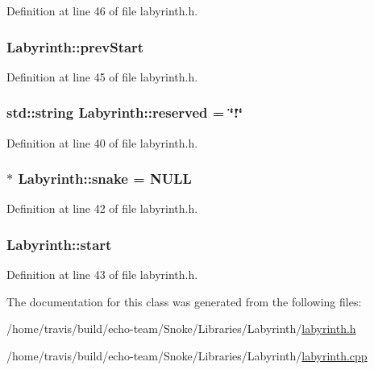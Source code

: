 Definition at line 46 of file labyrinth.\-h.

\hypertarget{class_labyrinth_a23e08d55e3a627e8a0d828d05be03253}{
\subsubsection[{prev\-Start}]{ Labyrinth\-::prev\-Start\hspace{0.3cm}{\ttfamily [private]}}}\label{class_labyrinth_a23e08d55e3a627e8a0d828d05be03253}


Definition at line 45 of file labyrinth.\-h.

\hypertarget{class_labyrinth_aafa921122b2ea77268cbe479949d7d39}{
\subsubsection[{reserved}]{\setlength{\rightskip}{0pt plus 5cm}std\-::string Labyrinth\-::reserved = \char`\"{}!\char`\"{}\hspace{0.3cm}{\ttfamily [private]}}}\label{class_labyrinth_aafa921122b2ea77268cbe479949d7d39}


Definition at line 40 of file labyrinth.\-h.

\hypertarget{class_labyrinth_a09a46368bfd83ccb75580687cb17b92f}{
\subsubsection[{snake}]{$\ast$ Labyrinth\-::snake = N\-U\-L\-L\hspace{0.3cm}{\ttfamily [private]}}}\label{class_labyrinth_a09a46368bfd83ccb75580687cb17b92f}


Definition at line 42 of file labyrinth.\-h.

\hypertarget{class_labyrinth_a92649fa3b24fcc869418b54e7362e24f}{
\subsubsection[{start}]{ Labyrinth\-::start\hspace{0.3cm}{\ttfamily [private]}}}\label{class_labyrinth_a92649fa3b24fcc869418b54e7362e24f}


Definition at line 43 of file labyrinth.\-h.



The documentation for this class was generated from the following files\-:\begin{DoxyCompactItemize}
\item 
/home/travis/build/echo-\/team/\-Snoke/\-Libraries/\-Labyrinth/\hyperlink{labyrinth_8h}{labyrinth.\-h}\item 
/home/travis/build/echo-\/team/\-Snoke/\-Libraries/\-Labyrinth/\hyperlink{labyrinth_8cpp}{labyrinth.\-cpp}\end{DoxyCompactItemize}
